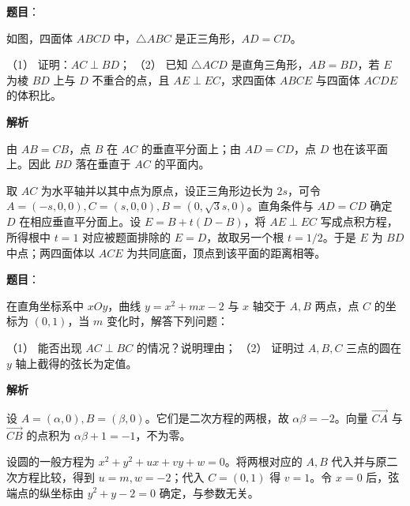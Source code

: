 \begin{answer}

\textbf{题目}：

如图，四面体 \(ABCD\) 中，\(\triangle ABC\) 是正三角形，\(AD=CD\)。
\nopagebreak[4]
\begin{center}\end{center}
\nopagebreak[4]
（1） 证明：\(AC\perp BD\)；
（2） 已知 \(\triangle ACD\) 是直角三角形，\(AB=BD\)，若 \(E\) 为棱 \(BD\) 上与 \(D\) 不重合的点，且 \(AE\perp EC\)，求四面体 \(ABCE\) 与四面体 \(ACDE\) 的体积比。

\textbf{解析}


由 \(AB=CB\)，点 \(B\) 在 \(AC\) 的垂直平分面上；由 \(AD=CD\)，点 \(D\) 也在该平面上。因此 \(BD\) 落在垂直于 \(AC\) 的平面内。


取 \(AC\) 为水平轴并以其中点为原点，设正三角形边长为 \(2s\)，可令 \(A=(-s,0,0),C=(s,0,0),B=(0,\sqrt3s,0)\)。直角条件与 \(AD=CD\) 确定 \(D\) 在相应垂直平分面上。设 \(E=B+t(D-B)\)，将 \(AE\perp EC\) 写成点积方程，所得根中 \(t=1\) 对应被题面排除的 \(E=D\)，故取另一个根 \(t=1/2\)。于是 \(E\) 为 \(BD\) 中点；两四面体以 \(ACE\) 为共同底面，顶点到该平面的距离相等。



\end{answer}
\begin{answer}

\textbf{题目}：

在直角坐标系中 \(xOy\)，曲线 \(y=x^2+mx-2\) 与 \(x\) 轴交于 \(A,B\) 两点，点 \(C\) 的坐标为 \((0,1)\)，当 \(m\) 变化时，解答下列问题：

（1） 能否出现 \(AC\perp BC\) 的情况？说明理由；
（2） 证明过 \(A,B,C\) 三点的圆在 \(y\) 轴上截得的弦长为定值。

\textbf{解析}


设 \(A=(\alpha,0),B=(\beta,0)\)。它们是二次方程的两根，故 \(\alpha\beta=-2\)。向量 \(\overrightarrow{CA}\) 与 \(\overrightarrow{CB}\) 的点积为 \(\alpha\beta+1=-1\)，不为零。


设圆的一般方程为 \(x^2+y^2+ux+vy+w=0\)。将两根对应的 \(A,B\) 代入并与原二次方程比较，得到 \(u=m,w=-2\)；代入 \(C=(0,1)\) 得 \(v=1\)。令 \(x=0\) 后，弦端点的纵坐标由 \(y^2+y-2=0\) 确定，与参数无关。



\end{answer}
